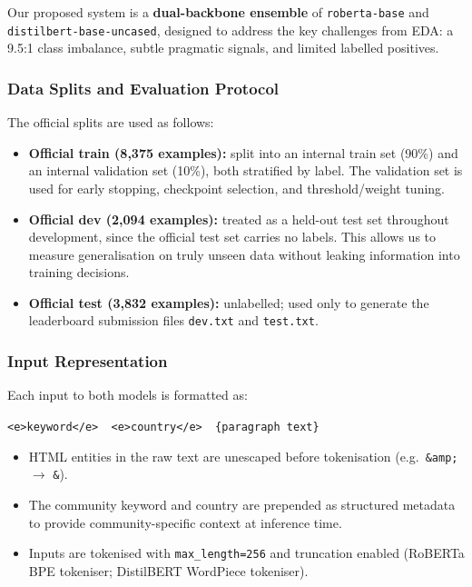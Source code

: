 \documentclass[11pt]{article}
\begin{document}
Our proposed system is a \textbf{dual-backbone ensemble} of \texttt{roberta-base} and \texttt{distilbert-base-\allowbreak{}uncased}, designed to address the key challenges from EDA: a 9.5:1 class imbalance, subtle pragmatic signals, and limited labelled positives.

\subsubsection*{Data Splits and Evaluation Protocol}

The official splits are used as follows:

\begin{itemize}[noitemsep]
    \item \textbf{Official train (8,375 examples):} split into an internal train set (90\%) and an internal validation set (10\%), both stratified by label. The validation set is used for early stopping, checkpoint selection, and threshold/weight tuning.
    \item \textbf{Official dev (2,094 examples):} treated as a held-out test set throughout development, since the official test set carries no labels. This allows us to measure generalisation on truly unseen data without leaking information into training decisions.
    \item \textbf{Official test (3,832 examples):} unlabelled; used only to generate the leaderboard submission files \texttt{dev.txt} and \texttt{test.txt}.
\end{itemize}

\subsubsection*{Input Representation}

Each input to both models is formatted as:
\begin{center}
    \texttt{<e>keyword</e>\ \ <e>country</e>\ \ \{paragraph text\}}
\end{center}
\begin{itemize}[noitemsep]
    \item HTML entities in the raw text are unescaped before tokenisation (e.g.\ \texttt{\&amp;} $\to$ \texttt{\&}).
    \item The community keyword and country are prepended as structured metadata to provide community-specific context at inference time.
    \item Inputs are tokenised with \texttt{max\_length=256} and truncation enabled (RoBERTa BPE tokeniser; DistilBERT WordPiece tokeniser).
\end{itemize}
\end{document}
